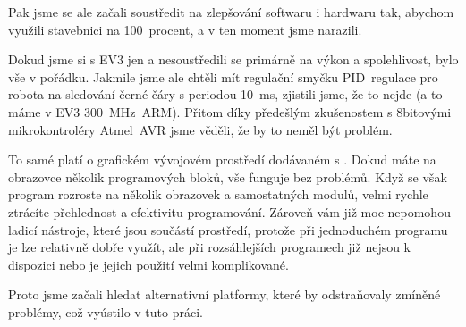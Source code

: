 Pak jsme se ale začali soustředit na zlepšování softwaru i hardwaru tak, abychom využili stavebnici na 100~procent, a v ten moment jsme narazili.
% 
% 
% 
%
%
% 
% 
% 
% 
% 

Dokud jsme si s EV3 jen  a nesoustředili se primárně na výkon a spolehlivost, bylo vše v pořádku. 
Jakmile jsme ale chtěli mít regulační smyčku PID~regulace pro robota na sledování černé čáry s periodou 10~ms, zjistili jsme, že to nejde (a to máme v EV3  300~MHz~ARM). Přitom díky předešlým zkušenostem s 8bitovými mikrokontroléry Atmel~AVR jsme věděli, že by to neměl být problém.
% 
% 
%
%

To samé platí o grafickém vývojovém prostředí dodávaném s \EVthree. Dokud máte na obrazovce několik programových bloků, vše funguje bez problémů. 
Když se však program rozroste na několik obrazovek a samostatných modulů, velmi rychle ztrácíte přehlednost a efektivitu programování.
Zároveň vám již moc nepomohou ladicí nástroje, které jsou součástí prostředí, protože při jednoduchém programu je lze relativně dobře využít, ale při rozsáhlejších programech již nejsou k dispozici nebo je jejich použití velmi komplikované. 
% 
% 
%
%

Proto jsme začali hledat alternativní platformy, které by odstraňovaly zmíněné problémy, což vyústilo v tuto práci.   
% 
% 
% 
%
%
